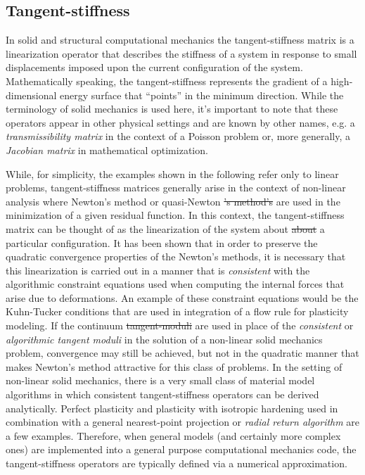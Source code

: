 \documentclass[preprint,12pt]{elsarticle}
\providecommand{\DIFaddtex}[1]{{\protect\color{blue}\uwave{#1}}} %
\providecommand{\DIFdeltex}[1]{{\protect\color{red}\sout{#1}}}                      %
\providecommand{\DIFaddbegin}{} %
\providecommand{\DIFaddend}{} %
\providecommand{\DIFdelbegin}{} %
\providecommand{\DIFdelend}{} %
\providecommand{\DIFadd}[1]{\texorpdfstring{\DIFaddtex{#1}}{#1}} %
\providecommand{\DIFdel}[1]{\texorpdfstring{\DIFdeltex{#1}}{}} %
\begin{document}
\subsection{Tangent-stiffness} 
\DIFaddbegin \label{subsec:TS}
\DIFaddend 

In solid and structural computational mechanics the tangent-stiffness matrix is a linearization operator that describes the stiffness of a system in response to small displacements imposed upon the current configuration of the system.  Mathematically speaking, the tangent-stiffness represents the gradient of a high-dimensional energy surface that ``points'' in the minimum direction. While the terminology of solid mechanics is used here, it's important to note that these operators appear in other physical settings and are known by other names, e.g. a \emph{transmissibility matrix} in the context of a Poisson problem or, more generally, a \emph{Jacobian matrix} in mathematical optimization.

While, for simplicity, the examples shown in the following refer only to linear problems, tangent-stiffness matrices generally arise in the context of non-linear analysis where Newton's method or quasi-Newton \DIFdelbegin \DIFdel{'s method's }\DIFdelend \DIFaddbegin \DIFadd{methods }\DIFaddend are used in the minimization of a given residual function.  In this context, the tangent-stiffness matrix can be thought of as the linearization of the system
about \DIFdelbegin \DIFdel{about }\DIFdelend a particular configuration.  It has been shown \cite{hughes1978consistent,hughes1978unconditionally} that in order to preserve the quadratic convergence properties of the Newton's methods, it is necessary that this linearization is carried out in a manner that is \emph{consistent} with the algorithmic constraint equations used when computing the internal forces that arise due to deformations.  An example of these constraint equations would be the Kuhn-Tucker conditions \cite{simo1998} that are used in integration of a flow rule for plasticity modeling.  If the continuum \DIFdelbegin \DIFdel{tangent-moduli }\DIFdelend \DIFaddbegin \DIFadd{tangent-modulii }\DIFaddend are used in place of the \emph{consistent} or \emph{algorithmic tangent moduli} in the solution of a non-linear solid mechanics problem, convergence may still be achieved, but not in the quadratic manner that makes Newton's method attractive for this class of problems.  In the setting of non-linear solid mechanics, there is a very small class of material model algorithms in which consistent tangent-stiffness operators can be derived analytically.  Perfect plasticity and plasticity with isotropic hardening used in combination with a general nearest-point projection or \emph{radial return algorithm} are a few examples.  Therefore, when general models (and certainly more complex ones) are implemented into a general purpose computational mechanics code, the tangent-stiffness operators are typically defined via a numerical approximation.  
\end{document}
